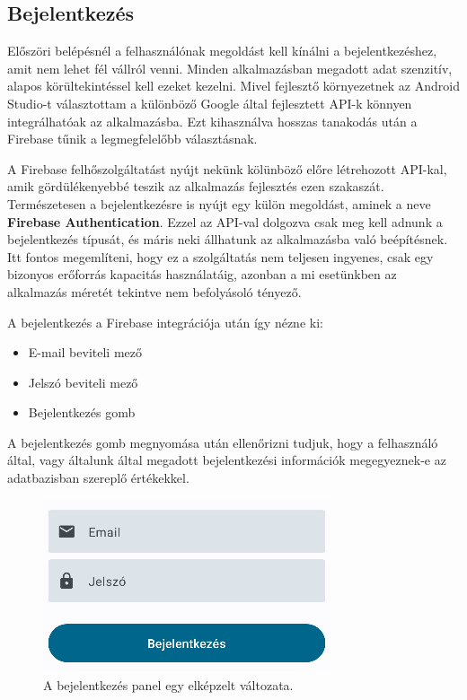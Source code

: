 \subsection{Bejelentkezés}

Előszöri belépésnél a felhasználónak megoldást kell kínálni a bejelentkezéshez, amit nem lehet fél vállról venni. Minden alkalmazásban megadott adat szenzitív, alapos körültekintéssel kell ezeket kezelni. Mivel fejlesztő környezetnek az Android Studio-t választottam a különböző Google által fejlesztett API-k könnyen integrálhatóak az alkalmazásba. Ezt kihasználva hosszas tanakodás után a Firebase tűnik a legmegfelelőbb választásnak. 

A Firebase felhőszolgáltatást nyújt nekünk kölünböző előre létrehozott API-kal, amik gördülékenyebbé teszik az alkalmazás fejlesztés ezen szakaszát. Természetesen a bejelentkezésre is nyújt egy külön megoldást, aminek a neve \textbf{Firebase Authentication}\cite{firebaseauthentication}. Ezzel az API-val dolgozva csak meg kell adnunk a bejelentkezés típusát, és máris neki állhatunk az alkalmazásba való beépítésnek. Itt fontos megemlíteni, hogy ez a szolgáltatás nem teljesen ingyenes, csak egy bizonyos erőforrás kapacitás használatáig, azonban a mi esetünkben az alkalmazás méretét tekintve nem befolyásoló tényező.

A bejelentkezés a Firebase integrációja után így nézne ki:
\begin{itemize}
    \item E-mail beviteli mező
    \item Jelszó beviteli mező
    \item Bejelentkezés gomb
\end{itemize}

A bejelentkezés gomb megnyomása után ellenőrizni tudjuk, hogy a felhasználó által, vagy általunk által megadott bejelentkezési információk megegyeznek-e az adatbazisban szereplő értékekkel. 

\begin{figure}[h]
\centering
\includegraphics[scale=1]{images/login.png}
\caption{A bejelentkezés panel egy elképzelt változata.}
\label{fig:loginpanel}
\end{figure}

